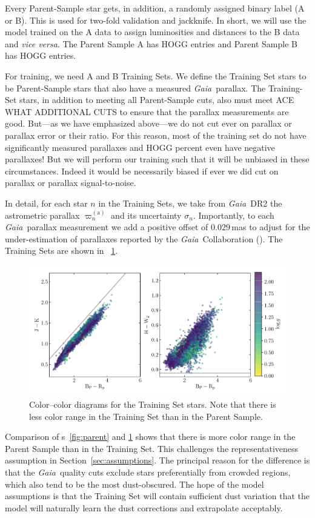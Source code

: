 \documentclass[modern]{aastex62}
\newcommand{\sectionname}{Section}
\newcommand{\foreign}[1]{\textsl{#1}}
\newcommand{\project}[1]{\textsl{#1}}
\newcommand{\gaia}{\project{Gaia}}
\newcommand{\gparallax}{\varpi^{(\mathrm{a})}}
\begin{document}
Every Parent-Sample star gets, in addition, a randomly assigned binary
label (A or B).
This is used for two-fold validation and jackknife.
In short, we will use the model trained on the A data to assign luminosities
and distances to the B data and \foreign{vice versa}.
The Parent Sample A has HOGG entries and Parent Sample B has HOGG entries.

For training, we need A and B Training Sets.
We define the Training Set stars to be Parent-Sample stars that also
have a measured \gaia\ parallax.
The Training-Set stars, in addition to meeting all Parent-Sample cuts,
also must meet ACE WHAT ADDITIONAL CUTS to ensure that the parallax
measurements are good.
But---as we have emphasized above---we do not cut ever on parallax or
parallax error or their ratio. For this reason, most of the training set
do not have significantly measured parallaxes and HOGG percent even have
negative parallaxes!
But we will perform our training such that it will be unbiased in these
circumstances.
Indeed it would be necessarily biased if ever we did cut on parallax or
parallax signal-to-noise.

In detail,
for each star $n$ in the Training Sets, we take from \gaia\ DR2
the astrometric parallax $\gparallax_n$ and its uncertainty $\sigma_n$.
Importantly, to each \gaia\ parallax measurement we add a positive
offset of $0.029$\,mas to adjust for the under-estimation of
parallaxes reported by the \gaia\ Collaboration (\citealt{lindegren}).
The Training Sets are shown in \figurename~\ref{fig:training}.
\begin{figure}
\includegraphics[width=\textwidth]{./training_sample.pdf}
\caption{Color--color diagrams for the Training Set stars.
  Note that there is less color range in the Training Set than in the
  Parent Sample.\label{fig:training}}
\end{figure}

Comparison of {\figurename s}~\ref{fig:parent} and \ref{fig:training} shows
that there is more color range in the Parent Sample than in the Training Set.
This challenges the representativeness assumption in \sectionname~\ref{sec:assumptions}.
The principal reason for the difference is that the \gaia\ quality cuts
exclude stars preferentially from crowded regions, which also tend to be the
most dust-obscured.
The hope of the model assumptions is that the Training Set will contain sufficient
dust variation that the model will naturally learn the dust corrections and extrapolate
acceptably.
\end{document}
